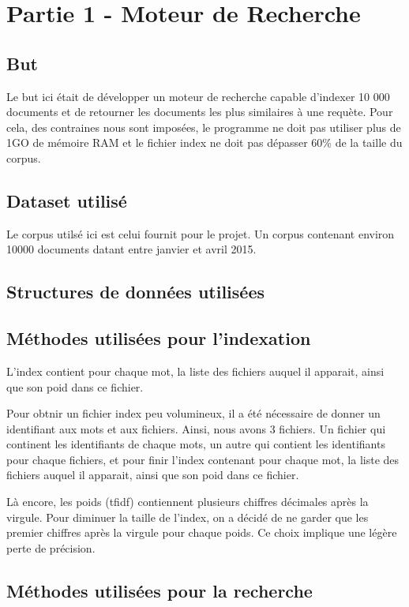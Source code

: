 \chapter{Partie 1 - Moteur de Recherche}

\section{But}
	Le but ici était de développer un moteur de recherche capable d'indexer 10 000 documents et de retourner les documents les plus similaires à une requète. Pour cela, des contraines nous sont imposées, le programme ne doit pas utiliser plus de 1GO de mémoire RAM et le fichier index ne doit pas dépasser 60\% de la taille du corpus.
\section{Dataset utilisé}
	Le corpus utilsé ici est celui fournit pour le projet. Un corpus contenant environ 10000 documents datant entre janvier et avril 2015.
\section{Structures de données utilisées}

\section{Méthodes utilisées pour l'indexation}
	L'index contient pour chaque mot, la liste des fichiers auquel il apparait, ainsi que son poid dans ce fichier.
	
	Pour obtnir un fichier index peu volumineux, il a été nécessaire de donner un identifiant aux mots et aux fichiers. Ainsi, nous avons 3 fichiers. Un fichier qui continent les identifiants de chaque mots, un autre qui contient les identifiants pour chaque fichiers, et pour finir l'index contenant pour chaque mot, la liste des fichiers auquel il apparait, ainsi que son poid dans ce fichier.
	
	Là encore, les poids (tfidf) contiennent plusieurs chiffres décimales après la virgule. Pour diminuer la taille de l'index, on a décidé de ne garder que les premier chiffres après la virgule pour chaque poids. Ce choix implique une légère perte de précision.

\section{Méthodes utilisées pour la recherche}
